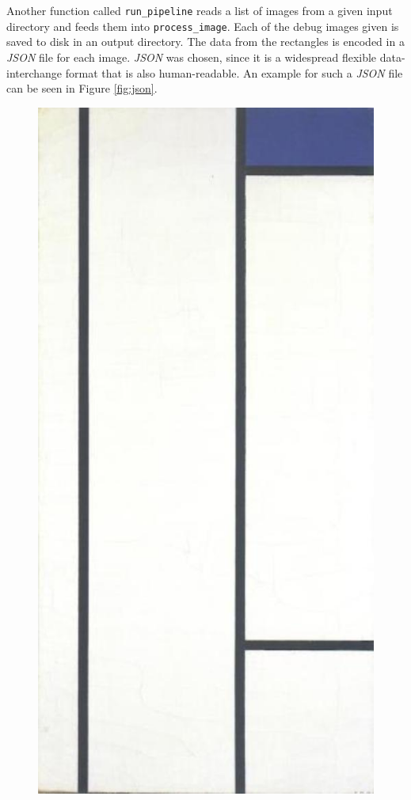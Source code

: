 \documentclass[serif,article,noparskip]{agse-thesis}
\begin{document}

Another function called \texttt{run\_pipeline} reads a list of images from a
given input directory and feeds them into \texttt{process\_image}. Each of the
debug images given is saved to disk in an output directory. The data from the
rectangles is encoded in a \textit{JSON} file for each image. \textit{JSON} was
chosen, since it is a widespread flexible data-interchange format that is also
human-readable. An example for such a \textit{JSON} file can be seen in Figure
\ref{fig:json}.

\begin{figure}
\begin{minipage}{0.2\textwidth}
  \includegraphics[width=\linewidth]{images/B244.jpg}

\end{minipage}
\end{figure}
\end{document}
